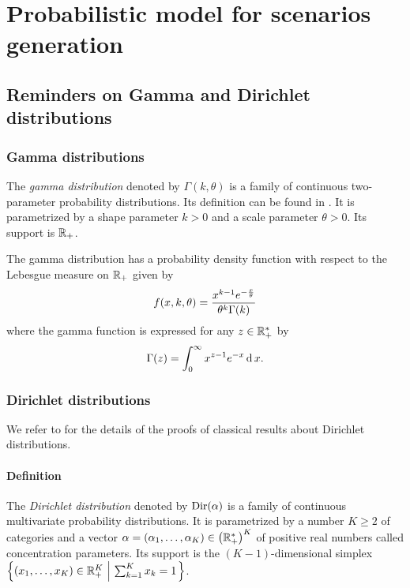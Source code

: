 \chapter{Probabilistic model for scenarios generation}
\label{chap:appendix:probabilistic-model}


\section{Reminders on Gamma and Dirichlet distributions}
\label{sec:reminders:gamma-and-dirichlet-distributions}


\subsection{Gamma distributions}


The \emph{gamma distribution} denoted by $\Gamma(k,\theta)$ is a family of continuous two-parameter probability distributions.
Its definition can be found in \citet[Appendix A]{Delmas2006}.
It is parametrized by a shape parameter $k>0$ and a scale parameter $\theta>0$.
Its support is $\mathbb{R}_+$.


The gamma distribution has a probability density function with respect to the Lebesgue measure on $\mathbb{R}_+$ given by
\begin{equation}\label{eq:dirchlet:probability-density-function}
  f\bracket{x,k,\theta} = \frac{x^{k-1}e^{-\frac{x}{\theta}}}{ \theta^k\Gamma\bracket{k} }
\end{equation}
where the gamma function is expressed for any $z\in\mathbb{R}_+^*$ by
\begin{equation}
  \Gamma\bracket{z} = \int_0^{\infty} x^{z-1}e^{-x} \diff x.
\end{equation}


\subsection{Dirichlet distributions}


We refer to \citet[Chapter 49]{Kotz2000} for the details of the proofs of classical results about Dirichlet distributions.


\subsubsection{Definition}


The \emph{Dirichlet distribution} denoted by $\operatorname{Dir}(\alpha)$ is a family of continuous multivariate probability distributions.
It is parametrized by a number $K \ge 2$ of categories and a vector $\alpha=\bracket{\alpha_1,\ldots,\alpha_K}\in\bracket{\RR_+^*}^K$ of positive real numbers called concentration parameters.
Its support is the $(K-1)$-dimensional simplex $\crbracket{\bracket{x_1,\ldots,x_K}\in\RR_+^K\ \left|\ \sum_{k=1}^K x_k = 1\right.}$.


